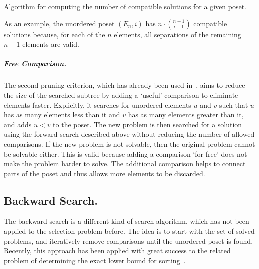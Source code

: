 \documentclass[a4paper,UKenglish,cleveref, autoref, thm-restate]{lipics-v2021}
\begin{document}
\begin{algorithm}[t]
  \centering
  
  \caption{Algorithm for computing the number of compatible solutions for a given poset.}
  \label{algo:compatible_solutions}
\end{algorithm}

As an example, the unordered poset $(E_n, i)$ has $n \cdot \binom{n - 1}{i - 1}$ compatible solutions because, for each of the $n$ elements, all separations of the remaining $n - 1$ elements are valid.


\subparagraph{Free Comparison.}
The second pruning criterion, which has already been used in~\cite{Oksanen}, aims to reduce the size of the searched subtree by adding a `useful' comparison to eliminate elements faster.
Explicitly, it searches for unordered elements $u$ and $v$ such that $u$ has as many elements less than it and $v$ has as many elements greater than it, and adds $u < v$ to the poset.
The new problem is then searched for a solution using the forward search described above without reducing the number of allowed comparisons.
If the new problem is not solvable, then the original problem cannot be solvable either.
This is valid because adding a comparison `for free' does not make the problem harder to solve.
The additional comparison helps to connect parts of the poset and thus allows more elements to be discarded.

\subsection{Backward Search.} \label{sec:backward}
The backward search is a different kind of search algorithm, which has not been applied to the selection problem before.
The idea is to start with the set of solved problems, and iteratively remove comparisons until the unordered poset is found.
Recently, this approach has been applied with great success to the related problem of determining the exact lower bound for sorting~\cite{stober2022lower}.
\end{document}
